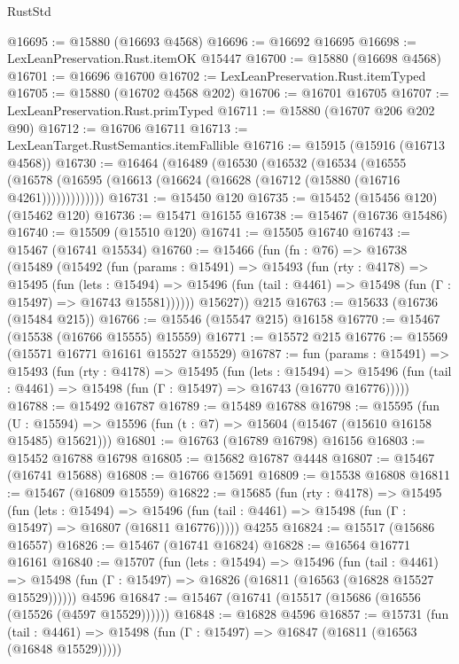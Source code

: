 \begin{lexlean}{RustStd}
\begin{coremodule}
@16695 := @15880 (@16693 @4568)
@16696 := @16692 @16695
@16698 := LexLeanPreservation.Rust.itemOK @15447
@16700 := @15880 (@16698 @4568)
@16701 := @16696 @16700
@16702 := LexLeanPreservation.Rust.itemTyped
@16705 := @15880 (@16702 @4568 @202)
@16706 := @16701 @16705
@16707 := LexLeanPreservation.Rust.primTyped
@16711 := @15880 (@16707 @206 @202 @90)
@16712 := @16706 @16711
@16713 := LexLeanTarget.RustSemantics.itemFallible
@16716 := @15915 (@15916 (@16713 @4568))
@16730 := @16464
    (@16489
      (@16530
        (@16532
          (@16534
            (@16555
              (@16578 (@16595 (@16613 (@16624 (@16628 (@16712 (@15880 (@16716 @4261)))))))))))))
@16731 := @15450 @120
@16735 := @15452 (@15456 @120) (@15462 @120)
@16736 := @15471 @16155
@16738 := @15467 (@16736 @15486)
@16740 := @15509 (@15510 @120)
@16741 := @15505 @16740
@16743 := @15467 (@16741 @15534)
@16760 := @15466
    (fun (fn : @76) =>
    @16738
      (@15489
        (@15492
          (fun (params : @15491) =>
          @15493
            (fun (rty : @4178) =>
            @15495
              (fun (lets : @15494) =>
              @15496 (fun (tail : @4461) => @15498 (fun (Γ : @15497) => @16743 @15581))))))
        @15627))
    @215
@16763 := @15633 (@16736 (@15484 @215))
@16766 := @15546 (@15547 @215) @16158
@16770 := @15467 (@15538 (@16766 @15555) @15559)
@16771 := @15572 @215
@16776 := @15569 (@15571 @16771 @16161 @15527 @15529)
@16787 := fun (params : @15491) =>
  @15493
    (fun (rty : @4178) =>
    @15495
      (fun (lets : @15494) =>
      @15496 (fun (tail : @4461) => @15498 (fun (Γ : @15497) => @16743 (@16770 @16776)))))
@16788 := @15492 @16787
@16789 := @15489 @16788
@16798 := @15595
    (fun (U : @15594) => @15596 (fun (t : @7) => @15604 (@15467 (@15610 @16158 @15485) @15621)))
@16801 := @16763 (@16789 @16798) @16156
@16803 := @15452 @16788 @16798
@16805 := @15682 @16787 @4448
@16807 := @15467 (@16741 @15688)
@16808 := @16766 @15691
@16809 := @15538 @16808
@16811 := @15467 (@16809 @15559)
@16822 := @15685
    (fun (rty : @4178) =>
    @15495
      (fun (lets : @15494) =>
      @15496 (fun (tail : @4461) => @15498 (fun (Γ : @15497) => @16807 (@16811 @16776)))))
    @4255
@16824 := @15517 (@15686 @16557)
@16826 := @15467 (@16741 @16824)
@16828 := @16564 @16771 @16161
@16840 := @15707
    (fun (lets : @15494) =>
    @15496
      (fun (tail : @4461) =>
      @15498 (fun (Γ : @15497) => @16826 (@16811 (@16563 (@16828 @15527 @15529))))))
    @4596
@16847 := @15467 (@16741 (@15517 (@15686 (@16556 (@15526 (@4597 @15529))))))
@16848 := @16828 @4596
@16857 := @15731
    (fun (tail : @4461) => @15498 (fun (Γ : @15497) => @16847 (@16811 (@16563 (@16848 @15529)))))

\end{coremodule}
\end{lexlean}

